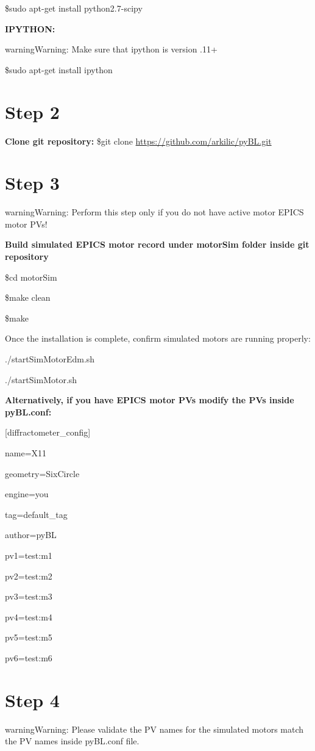 \documentclass[letterpaper,10pt,english]{sphinxmanual}
\begin{document}
\$sudo apt-get install python2.7-scipy

\textbf{IPYTHON:}

\begin{notice}{warning}{Warning:}
Make sure that ipython is version .11+
\end{notice}

\$sudo apt-get install ipython


\section{Step 2}
\label{Installation:step-2}
\textbf{Clone git repository:}
\$git clone \href{https://github.com/arkilic/pyBL.git}{https://github.com/arkilic/pyBL.git}


\section{Step 3}
\label{Installation:step-3}
\begin{notice}{warning}{Warning:}
Perform this step only if you do not have active motor EPICS motor PVs!
\end{notice}

\textbf{Build simulated EPICS motor record under motorSim folder inside git repository}

\$cd motorSim

\$make clean

\$make

Once the installation is complete, confirm simulated motors are running properly:

./startSimMotorEdm.sh

./startSimMotor.sh

\textbf{Alternatively, if you have EPICS motor PVs modify the PVs inside pyBL.conf:}

{[}diffractometer\_config{]}

name=X11

geometry=SixCircle

engine=you

tag=default\_tag

author=pyBL

pv1=test:m1

pv2=test:m2

pv3=test:m3

pv4=test:m4

pv5=test:m5

pv6=test:m6


\section{Step 4}
\label{Installation:step-4}
\begin{notice}{warning}{Warning:}
Please validate the PV names for the simulated motors match the PV names inside pyBL.conf file.
\end{notice}
\end{document}
